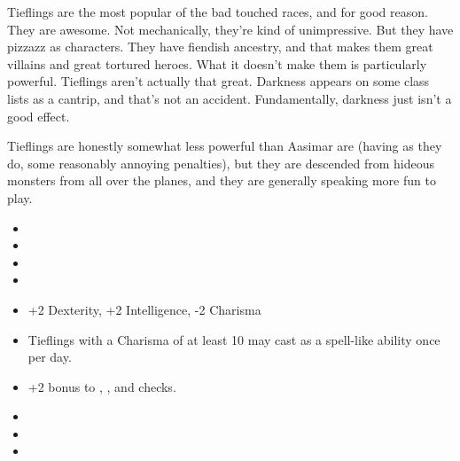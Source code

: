 
Tieflings are the most popular of the bad touched races, and for good reason. They are awesome. Not mechanically, they're kind of unimpressive. But they have pizzazz as characters. They have fiendish ancestry, and that makes them great villains and great tortured heroes. What it doesn't make them is particularly powerful. Tieflings aren't actually that great. Darkness appears on some class lists as a cantrip, and that's not an accident. Fundamentally, darkness just isn't a good effect.

Tieflings are honestly somewhat less powerful than Aasimar are (having as they do, some reasonably annoying penalties), but they are descended from hideous monsters from all over the planes, and they are generally speaking more fun to play.

\begin{itemize}
\item {}
\item {}
\item {}
\item {}
\item +2 Dexterity, +2 Intelligence, -2 Charisma
\item Tieflings with a Charisma of at least 10 may cast  as a spell-like ability once per day.
\item +2 bonus to , , and  checks.
\item {}
\item {}
\item {}
\end{itemize}
